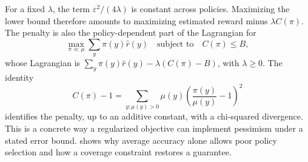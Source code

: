 \documentclass[11pt,twoside]{article}
\theoremstyle{definition}
\theoremstyle{remark}
\begin{document}
For a fixed $\lambda$, the term $\varepsilon^2/(4\lambda)$ is constant
across policies. Maximizing the lower bound therefore amounts to maximizing
estimated reward minus $\lambda C(\pi)$.
The penalty is also the policy-dependent part of the Lagrangian for
\[
 \max_{\pi\ll\mu}\sum_y\pi(y)\widehat r(y)
 \quad\text{subject to}\quad C(\pi)\le B,
\]
whose Lagrangian is
$\sum_y\pi(y)\widehat r(y)-\lambda(C(\pi)-B)$, with $\lambda\ge0$.
The identity
\begin{equation}
 C(\pi)-1=\sum_{y:\mu(y)>0}\mu(y)
 \left(\frac{\pi(y)}{\mu(y)}-1\right)^2
 \label{eq:coverage-chi}
\end{equation}
identifies the penalty, up to an additive constant, with a chi-squared
divergence. This is a concrete way a regularized objective can implement
pessimism under a stated error bound.  shows why
average accuracy alone allows poor policy selection and how a coverage
constraint restores a guarantee.
\end{document}
